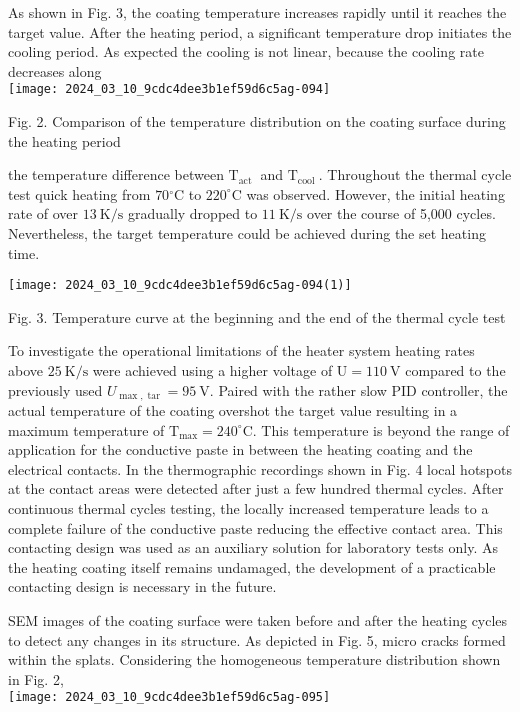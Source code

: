 \documentclass[10pt]{article}
\begin{document}
As shown in Fig. 3, the coating temperature increases rapidly until it reaches the target value. After the heating period, a significant temperature drop initiates the cooling period. As expected the cooling is not linear, because the cooling rate decreases along\\
\texttt{[image: 2024\_03\_10\_9cdc4dee3b1ef59d6c5ag-094]}

Fig. 2. Comparison of the temperature distribution on the coating surface during the heating period

the temperature difference between $\mathrm{T}_{\text {act }}$ and $\mathrm{T}_{\text {cool }}$. Throughout the thermal cycle test quick heating from $70{ }^{\circ} \mathrm{C}$ to $220^{\circ} \mathrm{C}$ was observed. However, the initial heating rate of over $13 \mathrm{~K} / \mathrm{s}$ gradually dropped to $11 \mathrm{~K} / \mathrm{s}$ over the course of 5,000 cycles. Nevertheless, the target temperature could be achieved during the set heating time.

\begin{center}
\texttt{[image: 2024\_03\_10\_9cdc4dee3b1ef59d6c5ag-094(1)]}
\end{center}

Fig. 3. Temperature curve at the beginning and the end of the thermal cycle test

To investigate the operational limitations of the heater system heating rates above $25 \mathrm{~K} / \mathrm{s}$ were achieved using a higher voltage of $\mathrm{U}=110 \mathrm{~V}$ compared to the previously used $U_{\max , \operatorname{tar}}=95 \mathrm{~V}$. Paired with the rather slow PID controller, the actual temperature of the coating overshot the target value resulting in a maximum temperature of $\mathrm{T}_{\max }=240^{\circ} \mathrm{C}$. This temperature is beyond the range of application for the conductive paste in between the heating coating and the electrical contacts. In the thermographic recordings shown in Fig. 4 local hotspots at the contact areas were detected after just a few hundred thermal cycles. After continuous thermal cycles testing, the locally increased temperature leads to a complete failure of the conductive paste reducing the effective contact area. This contacting design was used as an auxiliary solution for laboratory tests only. As the heating coating itself remains undamaged, the development of a practicable contacting design is necessary in the future.

SEM images of the coating surface were taken before and after the heating cycles to detect any changes in its structure. As depicted in Fig. 5, micro cracks formed within the splats. Considering the homogeneous temperature distribution shown in Fig. 2,\\
\texttt{[image: 2024\_03\_10\_9cdc4dee3b1ef59d6c5ag-095]}
\end{document}
